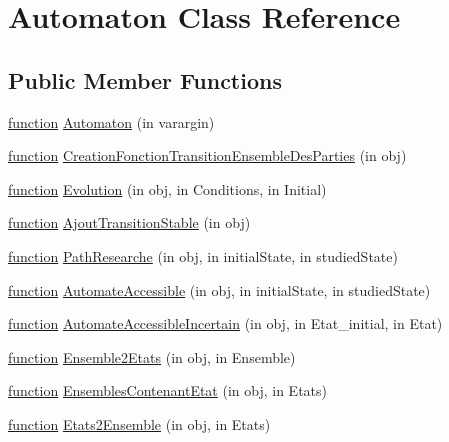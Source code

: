\hypertarget{class_automaton}{}\section{Automaton Class Reference}
\label{class_automaton}
\subsection*{Public Member Functions}
\begin{DoxyCompactItemize}
\item 
\hyperlink{_plan__desuma_functions_8m_ac2ffb26d6f42d3bbcd7847b0873403f4}{function} \hyperlink{class_automaton_a15c7a46aa4fae3aa3d810b530f3a8311}{Automaton} (in varargin)
\item 
\hyperlink{_plan__desuma_functions_8m_ac2ffb26d6f42d3bbcd7847b0873403f4}{function} \hyperlink{class_automaton_a4f83090137c23494ed5545f0238c06e5}{Creation\+Fonction\+Transition\+Ensemble\+Des\+Parties} (in obj)
\item 
\hyperlink{_plan__desuma_functions_8m_ac2ffb26d6f42d3bbcd7847b0873403f4}{function} \hyperlink{class_automaton_a8c68fee79107192dd9a4b7485766030e}{Evolution} (in obj, in Conditions, in Initial)
\item 
\hyperlink{_plan__desuma_functions_8m_ac2ffb26d6f42d3bbcd7847b0873403f4}{function} \hyperlink{class_automaton_aa987a80ff4dde5c085a21feb64d64d2e}{Ajout\+Transition\+Stable} (in obj)
\item 
\hyperlink{_plan__desuma_functions_8m_ac2ffb26d6f42d3bbcd7847b0873403f4}{function} \hyperlink{class_automaton_aa213172c8c114955cf1890a86a7cdd48}{Path\+Researche} (in obj, in initial\+State, in studied\+State)
\item 
\hyperlink{_plan__desuma_functions_8m_ac2ffb26d6f42d3bbcd7847b0873403f4}{function} \hyperlink{class_automaton_a8613ae6ec0dc5bde354258f7a4609517}{Automate\+Accessible} (in obj, in initial\+State, in studied\+State)
\item 
\hyperlink{_plan__desuma_functions_8m_ac2ffb26d6f42d3bbcd7847b0873403f4}{function} \hyperlink{class_automaton_ae93818a17bddca4b479c969caeb62b83}{Automate\+Accessible\+Incertain} (in obj, in Etat\+\_\+initial, in Etat)
\item 
\hyperlink{_plan__desuma_functions_8m_ac2ffb26d6f42d3bbcd7847b0873403f4}{function} \hyperlink{class_automaton_a35b222e5fa78c123b1d43bee19ca1064}{Ensemble2\+Etats} (in obj, in Ensemble)
\item 
\hyperlink{_plan__desuma_functions_8m_ac2ffb26d6f42d3bbcd7847b0873403f4}{function} \hyperlink{class_automaton_ad4e79b3f12249b02d4eba9263c657451}{Ensembles\+Contenant\+Etat} (in obj, in Etats)
\item 
\hyperlink{_plan__desuma_functions_8m_ac2ffb26d6f42d3bbcd7847b0873403f4}{function} \hyperlink{class_automaton_a41ce61d265f98a15142501564ec11d99}{Etats2\+Ensemble} (in obj, in Etats)
\end{DoxyCompactItemize}
